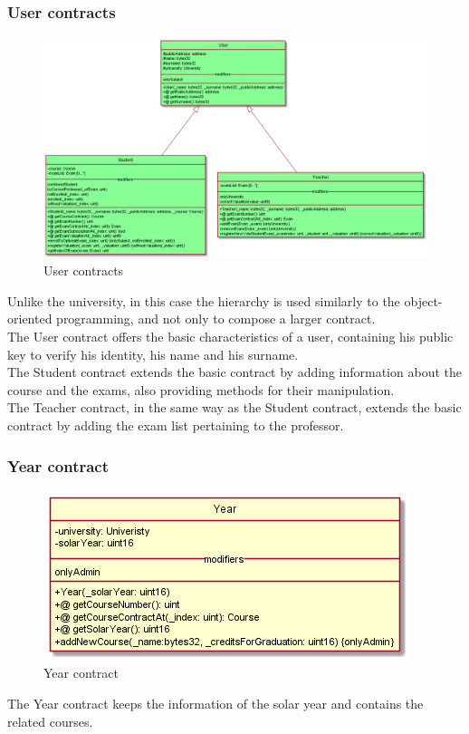 \documentclass[ManualeSviluppatore]{subfiles}
\begin{document}
\subsubsection{User contracts}
\begin{figure}[H]
	\centering
	\includegraphics[width=0.9\linewidth]{"diagrammi/solidity/user"}
	\caption{User contracts}
	\label{fig:User contracts}
\end{figure}
Unlike the university, in this case the hierarchy is used similarly to the object-oriented programming, and not only to compose a larger contract. \\
The User contract offers the basic characteristics of a user, containing his public key to verify his identity, his name and his surname. \\
The Student contract extends the basic contract by adding information about the course and the exams, also providing methods for their manipulation. \\
The Teacher contract, in the same way as the Student contract, extends the basic contract by adding the exam list pertaining to the professor. \\

\subsubsection{Year contract}
\begin{figure}[H]
	\centering
	\includegraphics[width=0.7\linewidth]{"diagrammi/solidity/year"}
	\caption{Year contract}
	\label{fig:Year contract}
\end{figure}
The Year contract keeps the information of the solar year and contains the related courses. \\
\end{document}
